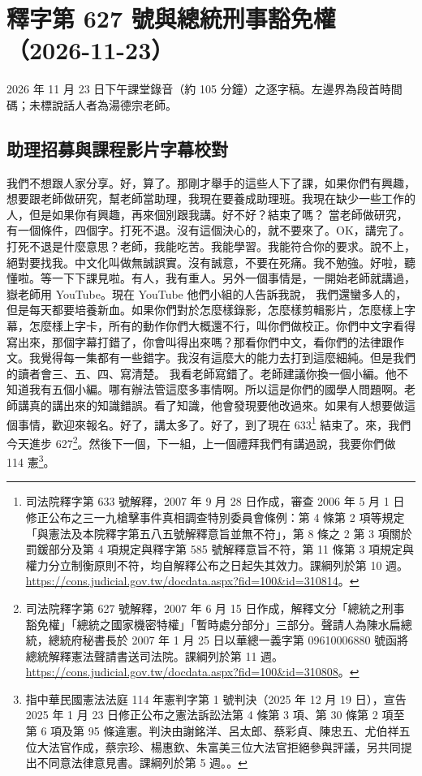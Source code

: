 \chapter{釋字第 627 號與總統刑事豁免權（2026-11-23）}

2026 年 11 月 23 日下午課堂錄音（約 105 分鐘）之逐字稿。左邊界為段首時間碼；未標說話人者為湯德宗老師。


\section{助理招募與課程影片字幕校對}

\hypertarget{c11:cue:1}{}我們不想跟人家分享。好，算了。那剛才舉手的這些人下了課，如果你們有興趣，想要跟老師做研究，幫老師當助理，我現在要養成助理班。我現在缺少一些工作的人，但是如果你有興趣，再來個別跟我講。好不好？結束了嗎？
\hypertarget{c11:cue:2}{}當老師做研究，有一個條件，四個字。打死不退。沒有這個決心的，就不要來了。OK，講完了。打死不退是什麼意思？老師，我能吃苦。我能學習。我能符合你的要求。說不上，絕對要找我。中文化叫做無誠誤實。沒有誠意，不要在死痛。我不勉強。好啦，聽懂啦。等一下下課見啦。有人，我有重人。另外一個事情是，一開始老師就講過，嶽老師用 YouTube。現在 YouTube 他們小組的人告訴我說，
\hypertarget{c11:cue:3}{}我們還蠻多人的，但是每天都要培養新血。如果你們對於怎麼樣錄影，怎麼樣剪輯影片，怎麼樣上字幕，怎麼樣上字卡，所有的動作你們大概還不行，叫你們做校正。你們中文字看得寫出來，那個字幕打錯了，你會叫得出來嗎？那看你們中文，看你們的法律跟作文。我覺得每一集都有一些錯字。我沒有這麼大的能力去打到這麼細純。但是我們的讀者會三、五、四、寫清楚。
\hypertarget{c11:cue:4}{}我看老師寫錯了。老師建議你換一個小編。他不知道我有五個小編。哪有辦法管這麼多事情啊。所以這是你們的國學人問題啊。老師講真的講出來的知識錯誤。看了知識，他會發現要他改過來。如果有人想要做這個事情，歡迎來報名。好了，講太多了。好了，到了現在 633\footnote{司法院釋字第 633 號解釋，2007 年 9 月 28 日作成，審查 2006 年 5 月 1 日修正公布之三一九槍擊事件真相調查特別委員會條例：第 4 條第 2 項等規定「與憲法及本院釋字第五八五號解釋意旨並無不符」，第 8 條之 2 第 3 項關於罰鍰部分及第 4 項規定與釋字第 585 號解釋意旨不符，第 11 條第 3 項規定與權力分立制衡原則不符，均自解釋公布之日起失其效力。課綱列於第 10 週。\url{https://cons.judicial.gov.tw/docdata.aspx?fid=100&id=310814}。} 結束了。來，我們今天進步 627\footnote{司法院釋字第 627 號解釋，2007 年 6 月 15 日作成，解釋文分「總統之刑事豁免權」「總統之國家機密特權」「暫時處分部分」三部分。聲請人為陳水扁總統，總統府秘書長於 2007 年 1 月 25 日以華總一義字第 09610006880 號函將總統解釋憲法聲請書送司法院。課綱列於第 11 週。\url{https://cons.judicial.gov.tw/docdata.aspx?fid=100&id=310808}。}。然後下一個，下一組，上一個禮拜我們有講過說，我要你們做 114 憲\footnote{指中華民國憲法法庭 114 年憲判字第 1 號判決（2025 年 12 月 19 日），宣告 2025 年 1 月 23 日修正公布之憲法訴訟法第 4 條第 3 項、第 30 條第 2 項至第 6 項及第 95 條違憲。判決由謝銘洋、呂太郎、蔡彩貞、陳忠五、尤伯祥五位大法官作成，蔡宗珍、楊惠欽、朱富美三位大法官拒絕參與評議，另共同提出不同意法律意見書。課綱列於第 5 週。\cite{ccj114-1}。}。

